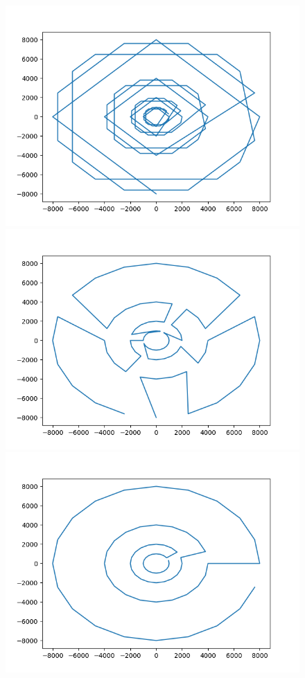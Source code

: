 \documentclass[12pt]{article}
\begin{document}
\begin{figure}
\includegraphics[scale=0.5]{20CirclesSwap.png}
\includegraphics[scale=0.5]{20CirclesTwoOpt.png}
\includegraphics[scale=0.5]{20CirclesGreedy.png}

\end{figure}
\end{document}
